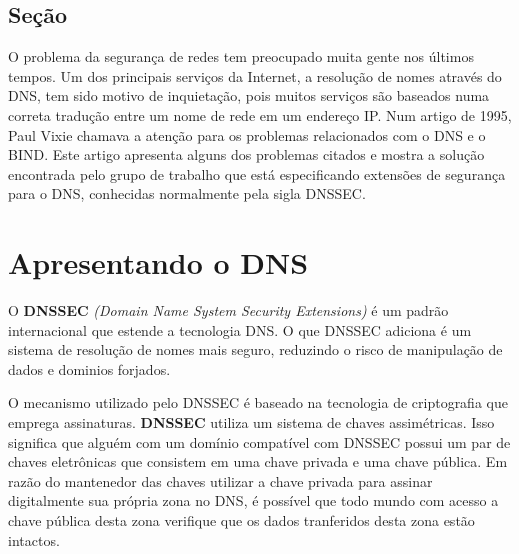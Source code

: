 \documentclass[12pt, a4paper]{abnt}
\begin{document}


\tableofcontents


%





\section{Seção}
O problema da segurança de redes tem preocupado muita gente nos últimos tempos. Um dos principais serviços da Internet, a resolução de nomes através do DNS, tem sido motivo de inquietação, pois muitos serviços são baseados numa correta tradução entre um nome de rede em um endereço IP. Num artigo de 1995, Paul Vixie chamava a atenção para os problemas relacionados com o DNS e o BIND. Este artigo apresenta alguns dos problemas citados e mostra a solução encontrada pelo grupo de trabalho que está especificando extensões de segurança para o DNS, conhecidas normalmente pela sigla DNSSEC.

\chapter{Apresentando o DNS}

O \textbf{DNSSEC} \textit{(Domain Name System Security Extensions)} é um padrão internacional que estende a tecnologia DNS. O que DNSSEC adiciona é um sistema de resolução de nomes mais seguro, reduzindo o risco de manipulação de dados e dominios forjados. 

O mecanismo utilizado pelo DNSSEC é baseado na tecnologia de criptografia que emprega assinaturas. \textbf{DNSSEC} utiliza um sistema de chaves assimétricas. Isso significa que alguém com um domínio compatível com DNSSEC possui um par de chaves eletrônicas que consistem em uma chave privada e uma chave pública. Em razão do mantenedor das chaves utilizar a chave privada para assinar digitalmente sua própria zona no DNS, é possível que todo mundo com acesso a chave pública desta zona verifique que os dados tranferidos desta zona estão intactos.
\end{document}
